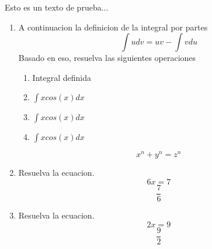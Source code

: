 \documentclass[12pt]{article}%
\begin{document}
%
\normalsize%
\pagestyle{header}%
Esto es un texto de prueba...%
\begin{enumerate}[wide, labelwidth=!, labelindent=0pt,label={Pregunta \arabic*. }]%
\item%
%
A continuacion la definicion de la integral por partes%
\[\int udv=uv-\int vdu\]%
Basado en eso, resuelva las siguientes operaciones%
\begin{enumerate}[wide, labelwidth=!, labelindent=0pt,label={\Alph*) }]%
\item%
%
Integral definida\\%
\item%
%
\(\int xcos(x)dx\)%
\item%
%
\(\int xcos(x)dx\)%
\item%
%
\(\int xcos(x)dx\)%
\end{enumerate}%
\[ x^n + y^n = z^n \]%
\item%
%
Resuelva la ecuacion.%
\begin{equation*}6 x = 7\end{equation*}%
\begin{equation*}\frac{7}{6}\end{equation*}%
\item%
%
Resuelva la ecuacion.%
\begin{equation*}2 x = 9\end{equation*}%
\begin{equation*}\frac{9}{2}\end{equation*}%
\end{enumerate}%
\end{document}
